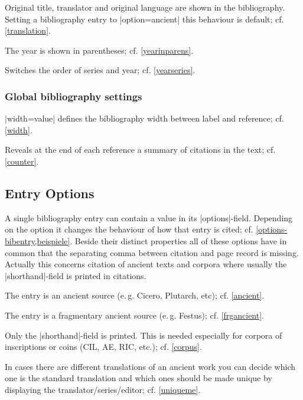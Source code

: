 \documentclass[a4paper,
10pt,
greek,
french,
spanish,
italian,
ngerman,
english
]{ltxdoc}
\begin{document}
Original title, translator and original language are shown in the bibliography. 
Setting a bibliography entry to |option={ancient}| this behaviour is default; cf. \cref{translation}. 

The year is shown in parentheses; cf. \cref{yearinparens}.

Switches the order of series and year; cf. \cref{yearseries}.
 
\subsubsection{Global bibliography settings}

|width={value}| defines the bibliography width between label and reference; cf. \cref{width}.

Reveals at the end of each reference a summary of citations in the text; cf. \cref{counter}.

\subsection{Entry Options}
A single bibliography entry can contain a value in its |options|-field.
Depending on the option it changes the behaviour of how that entry is cited; cf. \cref{options-bibentry,beispiele}. 
Beside their distinct properties all of these options have in common that the separating comma between citation and page record is missing. 
Actually this concerns citation of ancient texts and corpora where usually the |shorthand|-field is printed in citations.

The entry is an ancient source (e.\,g. Cicero, Plutarch, etc); cf. \cref{ancient}.

The entry is a fragmentary ancient source (e.\,g. Festus); cf. \cref{frgancient}.

Only the |shorthand|-field is printed.
This is needed especially for corpora of inscriptions or coins (CIL, AE, RIC, etc.); cf. \cref{corpus}.

In cases there are different translations of an ancient work you can decide which one is the standard translation and which ones should be made unique by displaying the translator/series/editor; cf. \cref{uniqueme}.

\end{document}
